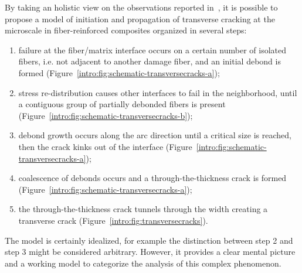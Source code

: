 By taking an holistic view on the observations reported in~\cite{Garrett1977,Parvizi1978a,Parvizi1978b,Bailey1979,Bailey1981,Zhang1997,Intro:Martyniuk2013}, it is possible to propose a model of initiation and propagation of transverse cracking at the microscale in fiber-reinforced composites organized in several steps:

\begin{enumerate}
\item failure at the fiber/matrix interface occurs on a certain number of isolated fibers, i.e. not adjacent to another damage fiber, and an initial debond is formed (Figure~\ref{intro:fig:schematic-transversecracks-a});
\item stress re-distribution causes other interfaces to fail in the neighborhood, until a contiguous group of partially debonded fibers is present (Figure~\ref{intro:fig:schematic-transversecracks-b});
\item debond growth occurs along the arc direction until a critical size is reached, then the crack kinks out of the interface (Figure~\ref{intro:fig:schematic-transversecracks-a});
\item coalescence of debonds occurs and a through-the-thickness crack is formed (Figure~\ref{intro:fig:schematic-transversecracks-a});
\item the through-the-thickness crack tunnels through the width creating a transverse crack (Figure~\ref{intro:fig:transversecracks}).
\end{enumerate}

The model is certainly idealized, for example the distinction between step 2 and step 3 might be considered arbitrary. However, it provides a clear mental picture and a working model to categorize the analysis of this complex phenomenon.

